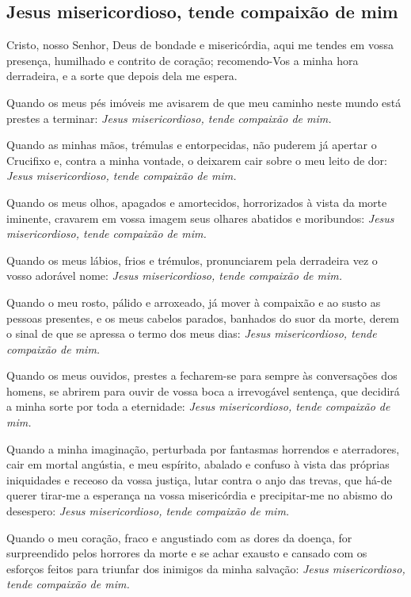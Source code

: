 \subsection{Jesus misericordioso, tende compaixão de mim}
 Cristo, nosso Senhor, Deus de bondade e misericórdia, aqui me tendes em vossa presença, humilhado e contrito de coração; recomendo-Vos a minha hora derradeira, e a sorte que depois dela me espera.\par
Quando os meus pés imóveis me avisarem de que meu caminho neste mundo está prestes a terminar: \textit{Jesus misericordioso, tende compaixão de mim.}\par
Quando as minhas mãos, trémulas e entorpecidas, não puderem já apertar o Crucifixo e, contra a minha vontade, o deixarem cair sobre o meu leito de dor: \textit{Jesus misericordioso, tende compaixão de mim.}\par
Quando os meus olhos, apagados e amortecidos, horrorizados à vista da morte iminente, cravarem em vossa imagem seus olhares abatidos e moribundos: \textit{Jesus misericordioso, tende compaixão de mim.}\par
Quando os meus lábios, frios e trémulos, pronunciarem pela derradeira vez o vosso adorável nome: \textit{Jesus misericordioso, tende compaixão de mim.}\par
Quando o meu rosto, pálido e arroxeado, já mover à compaixão e ao susto as pessoas presentes, e os meus cabelos parados, banhados do suor da morte, derem o sinal de que se apressa o termo dos meus dias: \textit{Jesus misericordioso, tende compaixão de mim.}\par
Quando os meus ouvidos, prestes a fecharem-se para sempre às conversações dos homens, se abrirem para ouvir de vossa boca a irrevogável sentença, que decidirá a minha sorte por toda a eternidade: \textit{Jesus misericordioso, tende compaixão de mim.}\par
Quando a minha imaginação, perturbada por fantasmas horrendos e aterradores, cair em mortal angústia, e meu espírito, abalado e confuso à vista das próprias iniquidades e receoso da vossa justiça, lutar contra o anjo das trevas, que há-de querer tirar-me a esperança na vossa misericórdia e precipitar-me no abismo do desespero: \textit{Jesus misericordioso, tende compaixão de mim.}\par
Quando o meu coração, fraco e angustiado com as dores da doença, for surpreendido pelos horrores da morte e se achar exausto e cansado com os esforços feitos para triunfar dos inimigos da minha salvação: \textit{Jesus misericordioso, tende compaixão de mim.}\par
